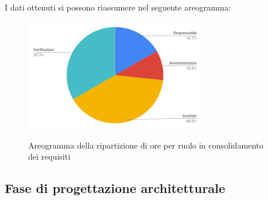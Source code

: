 \pagebreak
I dati ottenuti si possono riassumere nel seguente areogramma:
\begin{figure}[H] 
			\centering 
				\includegraphics[width=0.7\textwidth]{res/images/areogramma_consolidamento.png}\\
				\caption{Areogramma della ripartizione di ore per ruolo in consolidamento dei requisiti}
			\label{AreogrammaConsolidaemnto}
\end{figure}

\subsection{Fase di progettazione architetturale}
